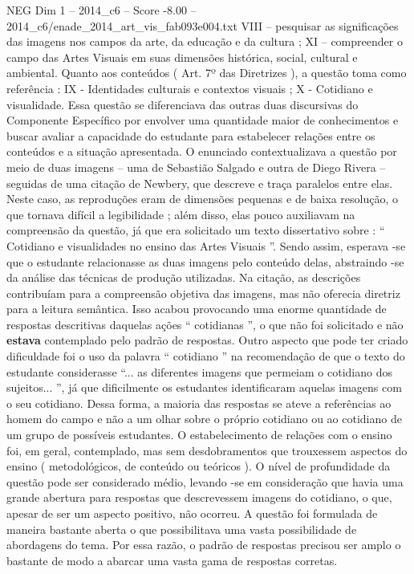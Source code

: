\begin{textsample}{NEG Dim 1 – 2014\_c6 – Score -8.00 – 2014\_c6/enade\_2014\_art\_vis\_fab093e004.txt}
VIII – pesquisar as significações das imagens nos campos da arte, da educação e da cultura ; XI – compreender o campo das Artes Visuais em suas dimensões histórica, social, cultural e ambiental.
Quanto aos conteúdos ( Art. 7º das Diretrizes ), a questão toma como referência : IX - Identidades culturais e contextos visuais ; X - Cotidiano e visualidade.
Essa questão se diferenciava das outras duas discursivas do Componente Específico por envolver uma quantidade maior de conhecimentos e buscar avaliar a capacidade do estudante para estabelecer relações entre os conteúdos e a situação apresentada.
O enunciado contextualizava a questão por meio de duas imagens – uma de Sebastião Salgado e outra de Diego Rivera – seguidas de uma citação de Newbery, que descreve e traça paralelos entre elas.
Neste caso, as reproduções eram de dimensões pequenas e de baixa resolução, o que tornava difícil a legibilidade ; além disso, elas pouco auxiliavam na compreensão da questão, já que era solicitado um texto dissertativo sobre : “ Cotidiano e visualidades no ensino das Artes Visuais ”.
Sendo assim, esperava -se que o estudante relacionasse as duas imagens pelo conteúdo delas, abstraindo -se da análise das técnicas de produção utilizadas.
Na citação, as descrições contribuíam para a compreensão objetiva das imagens, mas não oferecia diretriz para a leitura semântica.
Isso acabou provocando uma enorme quantidade de respostas descritivas daquelas ações “ cotidianas ”, o que não foi solicitado e não \textbf{estava} contemplado pelo padrão de respostas.
Outro aspecto que pode ter criado dificuldade foi o uso da palavra “ cotidiano ” na recomendação de que o texto do estudante considerasse “... as diferentes imagens que permeiam o cotidiano dos sujeitos... ”, já que dificilmente os estudantes identificaram aquelas imagens com o seu cotidiano.
Dessa forma, a maioria das respostas se ateve a referências ao homem do campo e não a um olhar sobre o próprio cotidiano ou ao cotidiano de um grupo de possíveis estudantes.
O estabelecimento de relações com o ensino foi, em geral, contemplado, mas sem desdobramentos que trouxessem aspectos do ensino ( metodológicos, de conteúdo ou teóricos ).
O nível de profundidade da questão pode ser considerado médio, levando -se em consideração que havia uma grande abertura para respostas que descrevessem imagens do cotidiano, o que, apesar de ser um aspecto positivo, não ocorreu.
A questão foi formulada de maneira bastante aberta o que possibilitava uma vasta possibilidade de abordagens do tema.
Por essa razão, o padrão de respostas precisou ser amplo o bastante de modo a abarcar uma vasta gama de respostas corretas.

\end{textsample}
